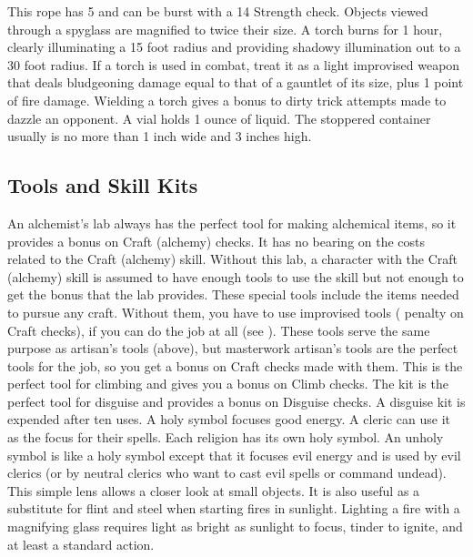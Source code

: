         This rope has 5  and can be burst with a  14 Strength check.
         Objects viewed through a spyglass are magnified to twice their size.
         A torch burns for 1 hour, clearly illuminating a 15 foot radius and providing shadowy illumination out to a 30 foot radius. If a torch is used in combat, treat it as a light improvised weapon that deals bludgeoning damage equal to that of a gauntlet of its size, plus 1 point of fire damage. Wielding a torch gives a  bonus to dirty trick attempts made to dazzle an opponent.
         A vial holds 1 ounce of liquid. The stoppered container usually is no more than 1 inch wide and 3 inches high.

    \subsection{Tools and Skill Kits}
         An alchemist's lab always has the perfect tool for making alchemical items, so it provides a  bonus on Craft (alchemy) checks. It has no bearing on the costs related to the Craft (alchemy) skill. Without this lab, a character with the Craft (alchemy) skill is assumed to have enough tools to use the skill but not enough to get the  bonus that the lab provides.
         These special tools include the items needed to pursue any craft. Without them, you have to use improvised tools ( penalty on Craft checks), if you can do the job at all (see ).
         These tools serve the same purpose as artisan's tools (above), but masterwork artisan's tools are the perfect tools for the job, so you get a  bonus on Craft checks made with them.
         This is the perfect tool for climbing and gives you a  bonus on Climb checks.
         The kit is the perfect tool for disguise and provides a  bonus on Disguise checks. A disguise kit is expended after ten uses.
         A holy symbol focuses good energy. A cleric can use it as the focus for their spells. Each religion has its own holy symbol.
         An unholy symbol is like a holy symbol except that it focuses evil energy and is used by evil clerics (or by neutral clerics who want to cast evil spells or command undead).
         This simple lens allows a closer look at small objects. It is also useful as a substitute for flint and steel when starting fires in sunlight. Lighting a fire with a magnifying glass requires light as bright as sunlight to focus, tinder to ignite, and at least a standard action.
